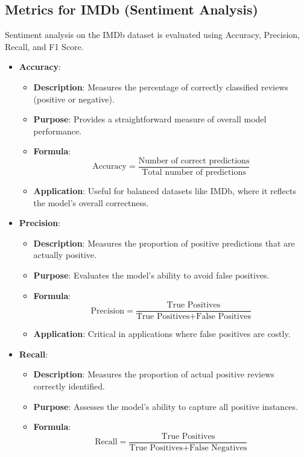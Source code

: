 \subsection{Metrics for IMDb (Sentiment Analysis)}
Sentiment analysis on the IMDb dataset is evaluated using Accuracy, Precision, Recall, and F1 Score.

\begin{itemize}
    \item \textbf{Accuracy}:
    \begin{itemize}
        \item \textbf{Description}: Measures the percentage of correctly classified reviews (positive or negative).
        \item \textbf{Purpose}: Provides a straightforward measure of overall model performance.
        \item \textbf{Formula}:
        \[
        \text{Accuracy} = \frac{\text{Number of correct predictions}}{\text{Total number of predictions}}
        \]
        \item \textbf{Application}: Useful for balanced datasets like IMDb, where it reflects the model's overall correctness.
    \end{itemize}
    \item \textbf{Precision}:
    \begin{itemize}
        \item \textbf{Description}: Measures the proportion of positive predictions that are actually positive.
        \item \textbf{Purpose}: Evaluates the model's ability to avoid false positives.
        \item \textbf{Formula}:
        \[
        \text{Precision} = \frac{\text{True Positives}}{\text{True Positives} + \text{False Positives}}
        \]
        \item \textbf{Application}: Critical in applications where false positives are costly.
    \end{itemize}
    \item \textbf{Recall}:
    \begin{itemize}
        \item \textbf{Description}: Measures the proportion of actual positive reviews correctly identified.
        \item \textbf{Purpose}: Assesses the model's ability to capture all positive instances.
        \item \textbf{Formula}:
        \[
        \text{Recall} = \frac{\text{True Positives}}{\text{True Positives} + \text{False Negatives}}
\]
\end{itemize}
\end{itemize}
